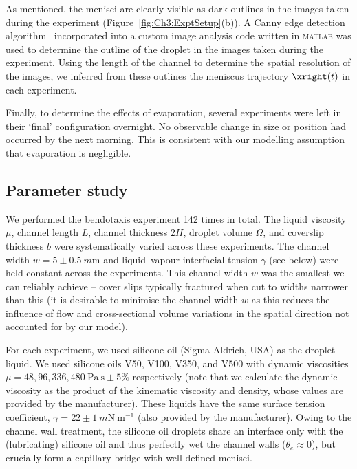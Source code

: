 As mentioned, the menisci are clearly visible as dark outlines in the images taken during the experiment (Figure~\ref{fig:Ch3:ExptSetup}(b)). A Canny edge detection algorithm~\citep{Canny1987} incorporated into a custom image analysis code written in
\textsc{matlab} was used to determine the outline of the droplet in the images taken during the experiment. Using the length of the channel to determine the spatial resolution of the images, we inferred from these outlines the meniscus trajectory $\xright(t)$ in each experiment.

Finally, to determine the effects of evaporation, several experiments were left in their `final' configuration overnight. No observable change in size or position had occurred by the next morning. This is consistent with our modelling assumption that evaporation is negligible.

\subsection{Parameter study}\label{S:Ch3:ExperimentalSetup:ParameterStudy}
We performed the bendotaxis experiment 142 times in total. The liquid viscosity $\mu$, channel length $L$, channel thickness $2H$, droplet volume $\Omega$, and coverslip thickness $b$ were systematically varied across these experiments. The channel width $w = 5\pm0.5~\si{m\meter}$ and liquid--vapour interfacial tension $\gamma $ (see below) were held constant across the experiments. This channel width $w$ was the smallest we can reliably achieve -- cover slips typically fractured when cut to widths narrower than this (it is desirable to minimise the channel width $w$ as this reduces the influence of flow and cross-sectional volume variations in the spatial direction not accounted for by our model).

For each experiment, we used silicone oil (Sigma-Aldrich, USA) as the droplet liquid. We used silicone oils V50, V100, V350, and V500 with dynamic viscosities $\mu  = 48, 96, 336, 480~\si{\pascal~\second} \pm 5\%$ respectively (note that we calculate the dynamic viscosity as the product of the kinematic viscosity and density, whose values are provided by the manufacturer). These liquids have the same surface tension coefficient, $\gamma = 22 \pm 1~\si{m\newton}~\si{\meter}^{-1}$ (also provided by the manufacturer). Owing to the channel wall treatment, the silicone oil droplets share an interface only with the (lubricating) silicone oil and thus perfectly wet the channel walls ($\theta_e \approx 0$), but crucially form a capillary bridge with well-defined menisci.

